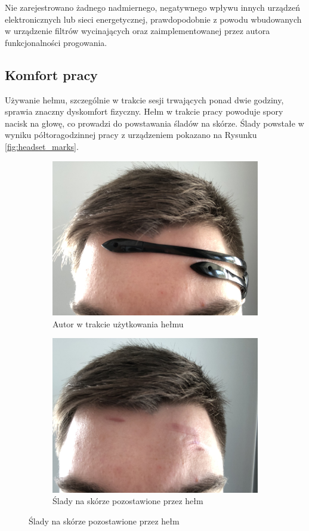 \documentclass[skorowidz,skroty]{dyplomWEZUT}
\begin{document}
Nie zarejestrowano żadnego nadmiernego, negatywnego wpływu innych urządzeń elektronicznych lub sieci energetycznej, prawdopodobnie z powodu wbudowanych w urządzenie filtrów wycinających oraz zaimplementowanej przez autora funkcjonalności progowania.

\subsection{Komfort pracy}
Używanie hełmu, szczególnie w trakcie sesji trwających ponad dwie godziny, sprawia znaczny dyskomfort fizyczny. Hełm w trakcie pracy powoduje spory nacisk na głowę, co prowadzi do powstawania śladów na skórze. Ślady powstałe w wyniku półtoragodzinnej pracy z urządzeniem pokazano na Rysunku \vref{fig:headset_marks}.

\begin{figure}[htb]
    \begin{subfigure}{0.49\textwidth}
        \includegraphics[width=\linewidth]{graphic/headset_before}
        \caption{Autor w trakcie użytkowania hełmu}
    \end{subfigure}\hspace*{\fill}
    \begin{subfigure}{0.49\textwidth}
        \includegraphics[width=\linewidth]{graphic/headset_after}
        \caption{Ślady na skórze pozostawione przez hełm}
    \end{subfigure}


\end{figure}
\end{document}
